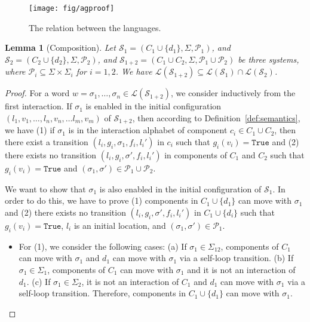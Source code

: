 \documentclass[10pt, a4paper, onecolumn, conference, compsocconf]{IEEEtran}
\newcommand{\true}{\texttt{True}}
\newtheorem{lemma}{Lemma}
\begin{document}
\begin{figure}
\centering
 \texttt{[image: fig/agproof]}
  \caption{The relation between the languages.}
 \label{fig:agproof}
\end{figure}

\begin{lemma}[Composition]\label{lem:composition}
Let $\mathcal{S}_{1} = (C_1 \cup \{d_1\}, \Sigma, \mathcal{P}_1)$, and $\mathcal{S}_{2} = (C_2 \cup \{d_2\}, \Sigma, \mathcal{P}_2)$, and $\mathcal{S}_{1+2} = (C_1 \cup C_2 , \Sigma, \mathcal{P}_1 \cup \mathcal{P}_2)$
be three systems, where $\mathcal{P}_i  \subseteq \Sigma \times \Sigma_i$ for $i=1,2$. We have $\mathcal{L}(\mathcal{S}_{1+2})\subseteq \mathcal{L}(\mathcal{S}_{1})\cap \mathcal{L}(\mathcal{S}_{2})$.
\end{lemma}
\begin{proof}
For a word $w=\sigma_1, \ldots, \sigma_n \in \mathcal{L}(\mathcal{S}_{1+2})$, we consider inductively from the first interaction.
If $\sigma_1$ is enabled in the initial configuration $(l_1,v_1,\ldots, l_n,v_n, \ldots l_m,v_m)$ of $\mathcal{S}_{1+2}$, then according to Definition~\ref{def:semantics}, we have (1) if $\sigma_1$ is in the interaction alphabet of component $c_i \in C_1 \cup C_2$, then there exist a transition $(l_i,g_i,\sigma_1 , f_i, l_i')$ in $c_i$ such that $g_i(v_i)=\true$ and (2) there exists no transition $(l_i,g_i,\sigma' , f_i, l_i')$ in components of $C_1$ and $C_2$ such that $g_i(v_i)=\true$ and $(\sigma_1,\sigma')\in \mathcal{P}_1 \cup \mathcal{P}_2$.

We want to show that $\sigma_1$ is also enabled in the initial configuration of $\mathcal{S}_{1}$. In order to do this, we have to prove (1) components in
$C_1\cup\{d_1\}$ can move with $\sigma_1$ and (2) there exists no transition $(l_i,g_i,\sigma' , f_i, l_i')$ in $C_1\cup \{d_i\}$ such that $g_i(v_i)=\true$, $l_i$ is an initial location, and $(\sigma_1,\sigma')\in \mathcal{P}_1$.
\begin{itemize}
  \item For (1), we consider the following cases:
        (a) If $\sigma_1 \in \Sigma_{12}$, components of $C_1$ can move with $\sigma_1$ and $d_1$ can move with $\sigma_1$ via a self-loop transition.
        (b) If $\sigma_1 \in \Sigma_{1}$, components of $C_1$ can move with $\sigma_1$ and it is not an interaction of $d_1$.
        (c) If $\sigma_1 \in \Sigma_{2}$, it is not an interaction of $C_1$ and $d_1$ can move with $\sigma_1$ via a self-loop transition.
        Therefore, components in $C_1\cup\{d_1\}$ can move with $\sigma_1$.


\end{itemize}
\end{proof}
\end{document}
